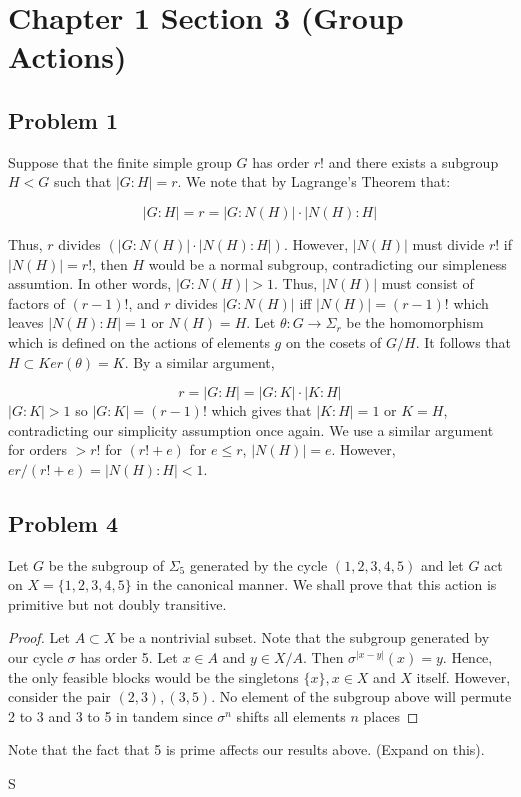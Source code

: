 \documentclass[12pt]{article}
\begin{document}
\section{Chapter 1 Section 3 (Group Actions)}

\subsection{Problem 1}
Suppose that the finite simple group $G$ has order $r!$ and there exists a subgroup $H < G$ such that 
$|G : H | = r$. We note that by Lagrange's Theorem that:

$$ |G:H| = r = |G : N(H)| \cdot |N(H) : H|$$
 
Thus, $r$ divides $(|G : N(H)| \cdot |N(H) : H|)$. However, $|N(H)|$ must divide $r!$ if $|N(H)| = r!$, then
$H$ would be a normal subgroup, contradicting our simpleness assumtion. In other words, $|G:N(H)| > 1$. Thus, $|N(H)|$ must consist of factors of $(r-1)!$, and $r$ divides $|G:N(H)|$ iff $|N(H)| = (r-1)!$ which leaves $|N(H) : H|  = 1$ or $N(H) = H$. Let $\theta: G \rightarrow \Sigma_r$ be the homomorphism which is defined on the actions of elements $g$ on the cosets of $G/H$. It follows that $H \subset Ker(\theta) = K$. By a similar argument,

$$ r = |G:H| = |G:K|\cdot |K:H| $$ 
 $|G:K| > 1$ so $|G:K| = (r-1)!$ which gives that $|K : H| = 1$ or $K = H$, contradicting our simplicity assumption once again. We use a similar argument for orders $> r!$ for $(r! + e)$ for $e\leq r$, $|N(H)| = e$. However, $er/(r!+e) = |N(H) : H| < 1$.
 
 
\subsection{Problem 4}

Let $G$ be the subgroup of $\Sigma_5$ generated by the cycle $(1,2,3,4,5)$ and let $G$ act on $X = \{1,2,3,4,5 \}$ in the canonical manner. We shall prove that this action is primitive but not doubly transitive.

\begin{proof}
Let $A \subset X$ be a nontrivial subset. Note that the subgroup generated by our cycle $\sigma$ has order 5.
Let $x \in A$ and $y \in X/A$. Then $\sigma^{|x-y|}(x) = y$. Hence, the only feasible blocks would be the singletons $\{x\}, x \in X$ and $X$ itself. However, consider the pair $(2,3), (3,5)$. No element of the subgroup above will permute 2 to 3 and 3 to 5 in tandem since $\sigma^n$ shifts all elements $n$
 places 
 \end{proof}
 
Note that the fact that 5 is prime affects our results above. (Expand on this).


S
  
\end{document}
